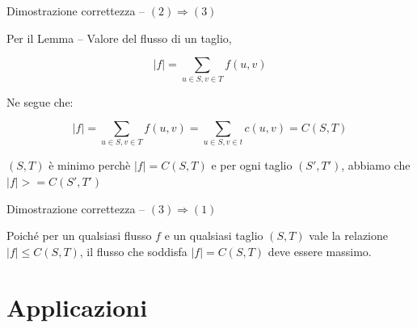 \begin{frame}{Dimostrazione correttezza -- $(2) \Rightarrow (3)$}

\vspace{-9pt}

\BIL
\item Per il Lemma -- Valore del flusso di un taglio,

\[ 
  |f| = \sum_{u \in S, v \in T} f(u,v)
\]
\item Ne segue che:

\[ 
  |f| = \sum_{u \in S, v \in T} f(u,v) = \sum_{u \in S, v \in t} c(u,v) = C(S,T)
\]

\item $(S,T)$ è minimo perchè $|f|=C(S,T)$ e per ogni taglio $(S', T')$, abbiamo che $|f| >= C(S', T')$

\EIL

\end{frame}

\begin{frame}{Dimostrazione correttezza -- $(3) \Rightarrow (1)$}

\vspace{-9pt}

\bigskip
Poiché per un qualsiasi flusso $f$ e un qualsiasi taglio $(S,T)$ vale la relazione $|f| \leq C(S,T)$, 
il flusso che soddisfa $|f| = C(S,T)$ deve essere massimo.

\end{frame}

\section{Applicazioni}

